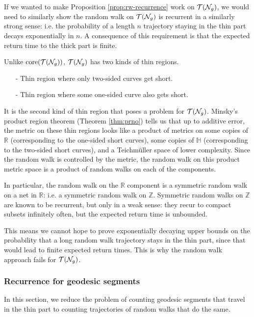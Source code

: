 If we wanted to make Proposition \ref{prop:rw-recurrence} work on $\mathcal{T}(\mathcal{N}_g)$, we would need to similarly show the random walk on $\mathcal{T}(\mathcal{N}_g)$ is recurrent in a similarly strong sense: i.e. the probability of a length $n$ trajectory staying in the thin part decays exponentially in $n$.
A consequence of this requirement is that the expected return time to the thick part is finite.

Unlike $\mathrm{core}(\mathcal{T}(\mathcal{N}_g))$, $\mathcal{T}(\mathcal{N}_g)$ has two kinds of thin regions.
\begin{itemize}
\item[-] Thin region where only two-sided curves get short.
\item[-] Thin region where some one-sided curve also gets short.
\end{itemize}

It is the second kind of thin region that poses a problem for $\mathcal{T}(\mathcal{N}_g)$.
Minsky's product region theorem (Theorem \ref{thm:prno}) tells us that up to additive error, the metric on these thin regions looks like a product of metrics on some copies of $\mathbb{R}$ (corresponding to the one-sided short curves), some copies of $\mathbb{H}$ (corresponding to the two-sided short curves), and a Teichmüller space of lower complexity.
Since the random walk is controlled by the metric, the random walk on this product metric space is a product of random walks on each of the components.

In particular, the random walk on the $\mathbb{R}$ component is a symmetric random walk on a net in $\mathbb{R}$: i.e. a symmetric random walk on $\mathbb{Z}$.
Symmetric random walks on $\mathbb{Z}$ are known to be recurrent, but only in a weak sense: they recur to compact subsets infinitely often, but the expected return time is unbounded.

This means we cannot hope to prove exponentially decaying upper bounds on the probability that a long random walk trajectory stays in the thin part, since that would lead to finite expected return times.
This is why the random walk approach fails for $\mathcal{T}(\mathcal{N}_g)$.

\subsubsection{Recurrence for geodesic segments}
\label{sec:recurr-geod-segm}

In this section, we reduce the problem of counting geodesic segments that travel in the thin part to counting trajectories of random walks that do the same.

